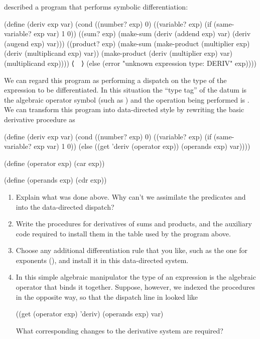 \begin{exercise}
	\label{Exercise 2.73}
	 described a program that performs symbolic differentiation:
	\begin{scheme}
	  (define (deriv exp var)
	    (cond ((number? exp) 0)
	          ((variable? exp)
	           (if (same-variable? exp var) 1 0))
	          ((sum? exp)
	           (make-sum (deriv (addend exp) var)
	                     (deriv (augend exp) var)))
	          ((product? exp)
	           (make-sum (make-product
	                      (multiplier exp)
	                      (deriv (multiplicand exp) var))
	                     (make-product
	                      (deriv (multiplier exp) var)
	                      (multiplicand exp))))
	          ⟨~~⟩
	          (else (error "unknown expression type:
	                        DERIV" exp))))
	\end{scheme}
	We can regard this program as performing a dispatch on the type of the expression to be differentiated.
	In this situation the “type tag” of the datum is the algebraic operator symbol (such as \code{+}) and the operation being performed is \code{deriv}.
	We can transform this program into data-directed style by rewriting the basic derivative procedure as
	\begin{scheme}
	  (define (deriv exp var)
	    (cond ((number? exp) 0)
	          ((variable? exp) (if (same-variable? exp var) 1 0))
	          (else ((get 'deriv (operator exp))
	                 (operands exp) var))))

	  (define (operator exp) (car exp))

	  (define (operands exp) (cdr exp))
	\end{scheme}
	\begin{enumerate}[label = \alph*., leftmargin = *]

		\item
			Explain what was done above.
			Why can’t we assimilate the predicates  and  into the data-directed dispatch?

		\item
			Write the procedures for derivatives of sums and products, and the auxiliary code required to install them in the table used by the program above.

		\item
			Choose any additional differentiation rule that you like, such as the one for exponents (), and install it in this data-directed system.

		\item
			In this simple algebraic manipulator the type of an expression is the algebraic operator that binds it together.
			Suppose, however, we indexed the procedures in the opposite way, so that the dispatch line in  looked like
			\begin{scheme}
			  ((get (operator exp) 'deriv) (operands exp) var)
			\end{scheme}
			What corresponding changes to the derivative system are required?

	\end{enumerate}
\end{exercise}
